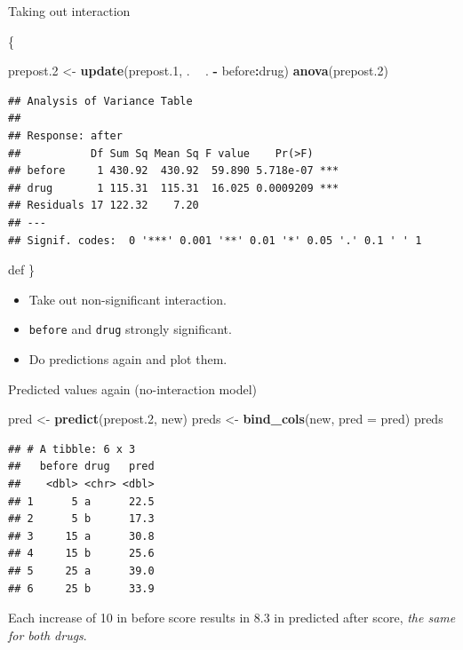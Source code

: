 \documentclass[ignorenonframetext,]{beamer}
\newenvironment{Shaded}{\begin{snugshade}}{\end{snugshade}}
\newcommand{\DataTypeTok}[1]{\textcolor[rgb]{0.13,0.29,0.53}{#1}}
\newcommand{\FloatTok}[1]{\textcolor[rgb]{0.00,0.00,0.81}{#1}}
\newcommand{\KeywordTok}[1]{\textcolor[rgb]{0.13,0.29,0.53}{\textbf{#1}}}
\newcommand{\NormalTok}[1]{#1}
\newcommand{\OperatorTok}[1]{\textcolor[rgb]{0.81,0.36,0.00}{\textbf{#1}}}
\newcommand{\StringTok}[1]{\textcolor[rgb]{0.31,0.60,0.02}{#1}}
\begin{document}
\begin{frame}[fragile]{Taking out interaction}
\protect\hypertarget{taking-out-interaction}{}

\{\small

\begin{Shaded}
\begin{Highlighting}[]
\NormalTok{prepost}\FloatTok{.2}\NormalTok{ <-}\StringTok{ }\KeywordTok{update}\NormalTok{(prepost}\FloatTok{.1}\NormalTok{, . }\OperatorTok{~}\StringTok{ }\NormalTok{. }\OperatorTok{-}\StringTok{ }\NormalTok{before}\OperatorTok{:}\NormalTok{drug)}
\KeywordTok{anova}\NormalTok{(prepost}\FloatTok{.2}\NormalTok{)}
\end{Highlighting}
\end{Shaded}

\begin{verbatim}
## Analysis of Variance Table
## 
## Response: after
##           Df Sum Sq Mean Sq F value    Pr(>F)    
## before     1 430.92  430.92  59.890 5.718e-07 ***
## drug       1 115.31  115.31  16.025 0.0009209 ***
## Residuals 17 122.32    7.20                      
## ---
## Signif. codes:  0 '***' 0.001 '**' 0.01 '*' 0.05 '.' 0.1 ' ' 1
\end{verbatim}

def \}

\begin{itemize}
\item
  Take out non-significant interaction.
\item
  \texttt{before} and \texttt{drug} strongly significant.
\item
  Do predictions again and plot them.
\end{itemize}

\end{frame}

\begin{frame}[fragile]{Predicted values again (no-interaction model)}
\protect\hypertarget{predicted-values-again-no-interaction-model}{}

\begin{Shaded}
\begin{Highlighting}[]
\NormalTok{pred <-}\StringTok{ }\KeywordTok{predict}\NormalTok{(prepost}\FloatTok{.2}\NormalTok{, new)}
\NormalTok{preds <-}\StringTok{ }\KeywordTok{bind_cols}\NormalTok{(new, }\DataTypeTok{pred =}\NormalTok{ pred)}
\NormalTok{preds}
\end{Highlighting}
\end{Shaded}

\begin{verbatim}
## # A tibble: 6 x 3
##   before drug   pred
##    <dbl> <chr> <dbl>
## 1      5 a      22.5
## 2      5 b      17.3
## 3     15 a      30.8
## 4     15 b      25.6
## 5     25 a      39.0
## 6     25 b      33.9
\end{verbatim}

Each increase of 10 in before score results in 8.3 in predicted after
score, \emph{the same for both drugs}.

\end{frame}
\end{document}
